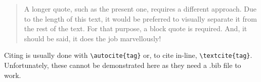 \documentclass[UKenglish]{article}
\begin{document}
\begin{quote}
	A longer quote, such as the present one, requires a different approach.
	Due to the length of this text, it would be preferred to visually separate it from the rest of the text.
	For that purpose, a block quote is required.
	And, it should be said, it does the job marvellously!
\end{quote}

Citing is usually done with \verb|\autocite{tag}| or, to cite in-line, \verb|\textcite{tag}|.
Unfortunately, these cannot be demonstrated here as they need a .bib file to work.

\printbibliography
\end{document}
